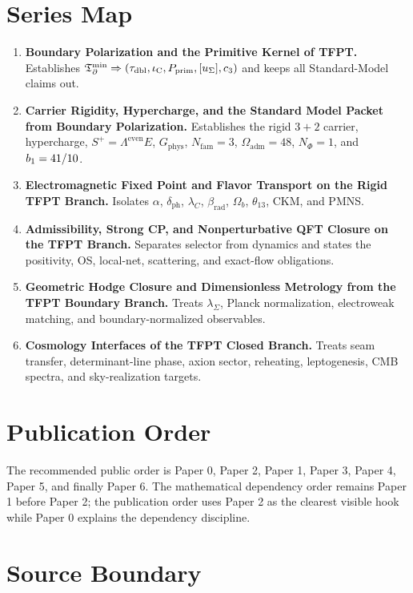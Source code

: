 \documentclass[11pt,a4paper]{article}
\begin{document}
\section{Series Map}

\begin{enumerate}[leftmargin=1.5em]
    \item \textbf{Boundary Polarization and the Primitive Kernel of TFPT.}
    Establishes $\mathfrak T_{\partial}^{\min}\Rightarrow(\tau_{\mathrm{dbl}},\iota_{\mathrm C},P_{\mathrm{prim}},[u_\Sigma],c_3)$ and keeps all
    Standard-Model claims out.
    \item \textbf{Carrier Rigidity, Hypercharge, and the Standard Model Packet from Boundary
    Polarization.}
    Establishes the rigid $3+2$ carrier, hypercharge, $S^+=\Lambda^{\mathrm{even}}E$,
    $G_{\mathrm{phys}}$, $N_{\mathrm{fam}}=3$, $\Omega_{\mathrm{adm}}=48$, $N_\Phi=1$, and
    $b_1=41/10$.
    \item \textbf{Electromagnetic Fixed Point and Flavor Transport on the Rigid TFPT Branch.}
    Isolates $\alpha$, $\delta_{\mathrm{ph}}$, $\lambda_C$, $\beta_{\mathrm{rad}}$, $\Omega_b$,
    $\theta_{13}$, CKM, and PMNS.
    \item \textbf{Admissibility, Strong CP, and Nonperturbative QFT Closure on the TFPT Branch.}
    Separates selector from dynamics and states the positivity, OS, local-net, scattering, and
    exact-flow obligations.
    \item \textbf{Geometric Hodge Closure and Dimensionless Metrology from the TFPT Boundary
    Branch.}
    Treats $\lambda_\Sigma$, Planck normalization, electroweak matching, and boundary-normalized
    observables.
    \item \textbf{Cosmology Interfaces of the TFPT Closed Branch.}
    Treats seam transfer, determinant-line phase, axion sector, reheating, leptogenesis, CMB
    spectra, and sky-realization targets.
\end{enumerate}

\section{Publication Order}

The recommended public order is Paper 0, Paper 2, Paper 1, Paper 3, Paper 4, Paper 5, and finally
Paper 6. The mathematical dependency order remains Paper 1 before Paper 2; the publication order
uses Paper 2 as the clearest visible hook while Paper 0 explains the dependency discipline.

\section{Source Boundary}
\end{document}
